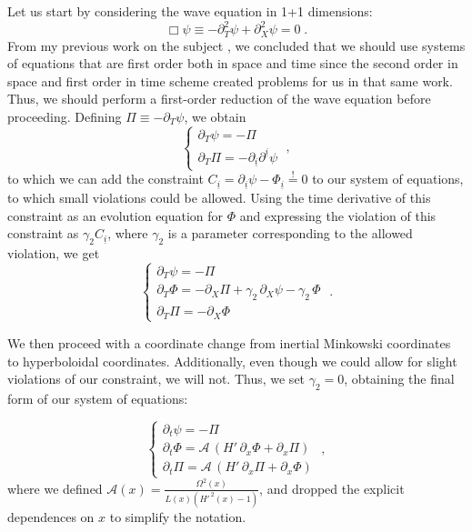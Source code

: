 Let us start by considering the wave equation in 1+1 dimensions:
%
\begin{equation}
    \Box \psi \equiv - \partial_T^2 \psi + \partial_X^2  \psi = 0 \;.
\end{equation}
%
From my previous work on the subject \cite{}, we concluded that we should use systems of equations that are first order both in space and time since the second order in space and first order in time scheme created problems for us in that same work. Thus, we should perform a first-order reduction of the wave equation before proceeding. Defining $\Pi \equiv -\partial_T \psi$, we obtain
%
\begin{equation}
    \left\{ \begin{array}{l} 
        \partial_T \psi = - \Pi \\ 
        \partial_T \Pi = -\partial_{\underline{i}} \partial^{\underline{i}} \psi 
    \end{array} \right. \; ,
\end{equation}
%
to which we can add the constraint $C_{\underline{i}} = \partial_{\underline{i}} \psi - \Phi_{\underline{i}} \overset{!}{=} 0$ to our system of equations, to which small violations could be allowed. Using the time derivative of this constraint as an evolution equation for $\Phi$ and expressing the violation of this constraint as $\gamma_2 C_{\underline{i}}$, where $\gamma_2$ is a parameter corresponding to the allowed violation, we get
%
\begin{equation}
    \left\{ \begin{array}{l} 
        \partial_T \psi = - \Pi \\ 
        \partial_T \Phi = - \partial_X \Pi + \gamma_2 \, \partial_X \psi - \gamma_2 \, \Phi\\
        \partial_T \Pi = -\partial_X \Phi
    \end{array} \right. \; .
\end{equation}

We then proceed with a coordinate change from inertial Minkowski coordinates to hyperboloidal coordinates. Additionally, even though we could allow for slight violations of our constraint, we will not. Thus, we set $\gamma_2 = 0$, obtaining the final form of our system of equations:

\begin{equation}
    \left\{ \begin{array}{l} 
        \partial_t \psi = - \Pi \\ 
        \partial_t \Phi = \mathcal{A} \, \left( H' \, \partial_x \Phi + \partial_x \Pi \right)\\
        \partial_t \Pi = \mathcal{A} \, \left( H' \, \partial_x \Pi + \partial_x \Phi \right)
    \end{array} \right. \; ,
\end{equation}
where we defined $\mathcal{A}(x) =\frac{\Omega^2(x)}{L(x)(H'^{\,2}(x)-1)}$, and dropped the explicit dependences on $x$ to simplify the notation.

